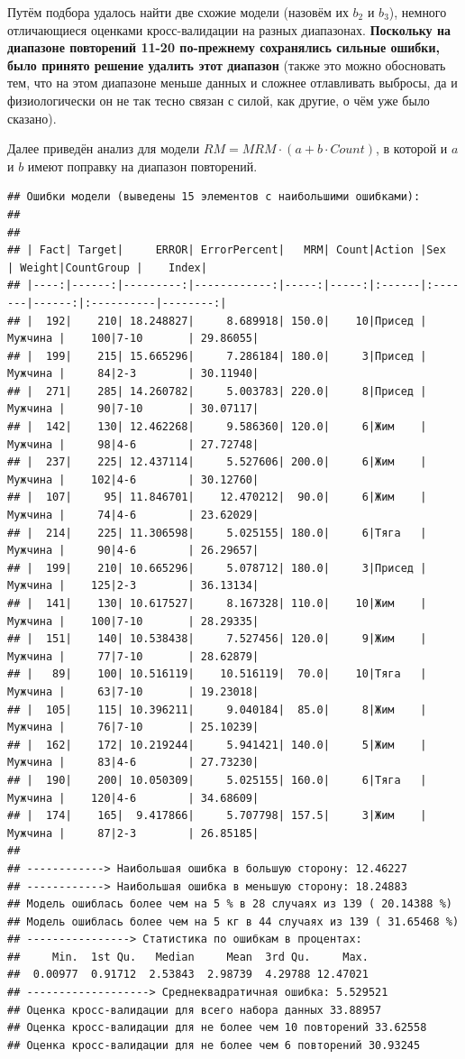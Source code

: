 \documentclass[
]{article}
\begin{document}
Путём подбора удалось найти две схожие модели (назовём их \(b_2\) и
\(b_3\)), немного отличающиеся оценками кросс-валидации на разных
диапазонах. \textbf{Поскольку на диапазоне повторений 11-20 по-прежнему
сохранялись сильные ошибки, было принято решение удалить этот диапазон}
(также это можно обосновать тем, что на этом диапазоне меньше данных и
сложнее отлавливать выбросы, да и физиологически он не так тесно связан
с силой, как другие, о чём уже было сказано).

Далее приведён анализ для модели \(RM=MRM \cdot(a+b \cdot Count)\), в
которой и \(a\) и \(b\) имеют поправку на диапазон повторений.

\begin{verbatim}
## Ошибки модели (выведены 15 элементов с наибольшими ошибками): 
## 
## 
## | Fact| Target|     ERROR| ErrorPercent|   MRM| Count|Action |Sex     | Weight|CountGroup |    Index|
## |----:|------:|---------:|------------:|-----:|-----:|:------|:-------|------:|:----------|--------:|
## |  192|    210| 18.248827|     8.689918| 150.0|    10|Присед |Мужчина |    100|7-10       | 29.86055|
## |  199|    215| 15.665296|     7.286184| 180.0|     3|Присед |Мужчина |     84|2-3        | 30.11940|
## |  271|    285| 14.260782|     5.003783| 220.0|     8|Присед |Мужчина |     90|7-10       | 30.07117|
## |  142|    130| 12.462268|     9.586360| 120.0|     6|Жим    |Мужчина |     98|4-6        | 27.72748|
## |  237|    225| 12.437114|     5.527606| 200.0|     6|Жим    |Мужчина |    102|4-6        | 30.12760|
## |  107|     95| 11.846701|    12.470212|  90.0|     6|Жим    |Мужчина |     74|4-6        | 23.62029|
## |  214|    225| 11.306598|     5.025155| 180.0|     6|Тяга   |Мужчина |     90|4-6        | 26.29657|
## |  199|    210| 10.665296|     5.078712| 180.0|     3|Присед |Мужчина |    125|2-3        | 36.13134|
## |  141|    130| 10.617527|     8.167328| 110.0|    10|Жим    |Мужчина |    100|7-10       | 28.29335|
## |  151|    140| 10.538438|     7.527456| 120.0|     9|Жим    |Мужчина |     77|7-10       | 28.62879|
## |   89|    100| 10.516119|    10.516119|  70.0|    10|Тяга   |Мужчина |     63|7-10       | 19.23018|
## |  105|    115| 10.396211|     9.040184|  85.0|     8|Жим    |Мужчина |     76|7-10       | 25.10239|
## |  162|    172| 10.219244|     5.941421| 140.0|     5|Жим    |Мужчина |     83|4-6        | 27.73230|
## |  190|    200| 10.050309|     5.025155| 160.0|     6|Тяга   |Мужчина |    120|4-6        | 34.68609|
## |  174|    165|  9.417866|     5.707798| 157.5|     3|Жим    |Мужчина |     87|2-3        | 26.85185|
## 
## ------------> Наибольшая ошибка в большую сторону: 12.46227 
## ------------> Наибольшая ошибка в меньшую сторону: 18.24883 
## Модель ошиблась более чем на 5 % в 28 случаях из 139 ( 20.14388 %)
## Модель ошиблась более чем на 5 кг в 44 случаях из 139 ( 31.65468 %)
## ----------------> Статистика по ошибкам в процентах:
##     Min.  1st Qu.   Median     Mean  3rd Qu.     Max. 
##  0.00977  0.91712  2.53843  2.98739  4.29788 12.47021 
## -------------------> Среднеквадратичная ошибка: 5.529521 
## Оценка кросс-валидации для всего набора данных 33.88957 
## Оценка кросс-валидации для не более чем 10 повторений 33.62558 
## Оценка кросс-валидации для не более чем 6 повторений 30.93245
\end{verbatim}
\end{document}
